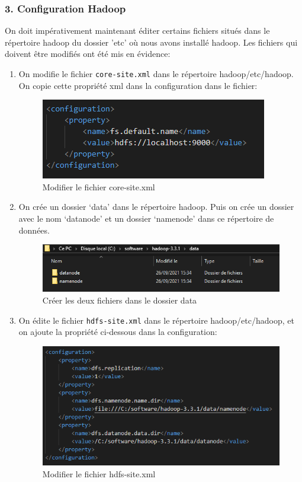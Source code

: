 \subsubsection{3. Configuration Hadoop}
On doit impérativement maintenant éditer certains fichiers situés dans le répertoire hadoop du dossier 'etc' où nous avons installé hadoop. Les fichiers qui doivent être modifiés ont été mis en évidence:

\begin{enumerate}
\item On modifie le fichier \texttt{core-site.xml} dans le répertoire hadoop/etc/hadoop. On copie cette propriété xml dans la configuration dans le fichier:
\begin{figure}[h]
	\centering
    \includegraphics[scale=0.6]{img/part3/1.5}
    \caption{Modifier le fichier core-site.xml}
\end{figure}

\item On crée un dossier ‘data’ dans le répertoire hadoop. Puis on crée un dossier avec le nom ‘datanode’ et un dossier ‘namenode’ dans ce répertoire de données.
\begin{figure}[h]
	\centering
    \includegraphics[scale=0.6]{img/part3/1.6}
    \caption{Créer les deux fichiers dans le dossier data}
\end{figure}

\newpage
\item On édite le fichier \texttt{hdfs-site.xml} dans le répertoire hadoop/etc/hadoop, et on ajoute la propriété ci-dessous dans la configuration:
\begin{figure}[h]
	\centering
    \includegraphics[scale=0.6]{img/part3/1.7}
    \caption{Modifier le fichier hdfs-site.xml}
\end{figure}


\end{enumerate}
